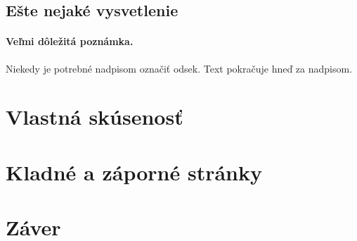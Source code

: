 \documentclass[10pt,twoside,slovak,a4paper]{article}
\begin{document}
\subsection{Ešte nejaké vysvetlenie} \label{ina:este}

\paragraph{Veľmi dôležitá poznámka.}
Niekedy je potrebné nadpisom označiť odsek. Text pokračuje hneď za nadpisom.



\section{Vlastná skúsenosť} \label{skusenost}




\section{Kladné a záporné stránky} \label{plusyminusy}




\section{Záver} \label{zaver} %






\end{document}
